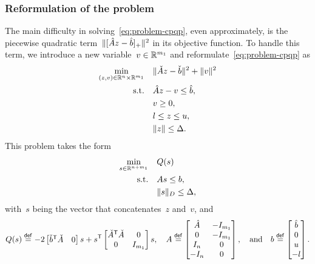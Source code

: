 \subsubsection{Reformulation of the problem}

The main difficulty in solving~\cref{eq:problem-cpqp}, even approximately, is the piecewise quadratic term~$\lVert[\hat{A} z - \hat{b}]_+\rVert^2$ in its objective function.
To handle this term, we introduce a new variable~$v \in \mathbb{R}^{m_1}$ and reformulate~\cref{eq:problem-cpqp} as
\begin{align*}
    \min_{(z, v) \in \R^n \times \R^{m_1}}  & \quad \norm{\check{A} z - \check{b}}^2 + \norm{v}^2\\
    \text{s.t.}                             & \quad \hat{A} z - v \le \hat{b},\\
                                            & \quad v \ge 0,\\
                                            & \quad \xl \le z \le \xu,\\
                                            & \quad \norm{z} \le \rad.
\end{align*}
This problem takes the form
\begin{subequations}
    \label{eq:problem-cpqp-reformulated}
    \begin{align}
        \min_{\sstep \in \R^{n + m_1}}  & \quad Q(\sstep)\\
        \text{s.t.}                     & \quad A \sstep \le b,\\
                                        & \quad \norm{\sstep}_{D} \le \rad, \label{eq:problem-cpqp-reformulated-tr}
    \end{align}
\end{subequations}
with~$s$ being the vector that concatenates~$z$ and~$v$, and
\begin{equation*}
    Q(\sstep) \eqdef - 2 \begin{bmatrix} \check{b}^{\T} \check{A} & 0 \end{bmatrix} s + s^{\T} \begin{bmatrix} \check{A}^{\T} \check{A} & 0\\ 0 & I_{m_1} \end{bmatrix} s, \quad 
    A \eqdef
    \begin{bmatrix}
        \hat{A} & -I_{m_1}\\
        0       & -I_{m_1}\\
        I_n     & 0\\
        -I_n    & 0
    \end{bmatrix}, \quad \text{and} \quad
    b \eqdef
    \begin{bmatrix}
        \hat{b}\\
        0\\
        \xu\\
        -\xl
    \end{bmatrix}.
\end{equation*}
